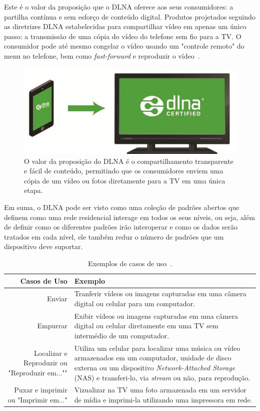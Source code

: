 Este é o valor da proposição que o DLNA oferece aos seus consumidores: a partilha contínua e sem esforço de conteúdo digital. Produtos projetados seguindo as diretrizes DLNA estabelecidas para compartilhar vídeo em apenas um único passo: a transmissão de uma cópia do vídeo do telefone sem fio para a TV. O consumidor pode até mesmo congelar o vídeo usando um "controle remoto" do menu no telefone, bem como \emph{fast-forward} e reproduzir o vídeo~\cite{dlnahdvideostreaming}.

\begin{figure}[ht]
	\center
	\includegraphics[scale=0.3]{imagens/dlna2}
	\caption{O valor da proposição do DLNA é o compartilhamento transparente e fácil de conteúdo, permitindo que os consumidores enviem uma cópia de um vídeo ou fotos diretamente para a TV em uma única etapa.}
	\label{fig:dlnaProccess}
\end{figure}

Em suma, o DLNA pode ser visto como uma coleção de padrões abertos que definem como uma rede residencial interage em todos os seus níveis, ou seja, além de definir como os diferentes padrões irão interoperar e como os dados serão tratados em cada nível, ele também reduz o número de padrões que um dispositivo deve suportar.

\begin{table}
	\begin{center}
		\begin{tabular}{rl}
		\hline
		\textbf{Casos de Uso} & \textbf{Exemplo}																\\
		\hline
		Enviar & Tranferir vídeos ou imagens capturadas em uma câmera digital ou celular para um computador.	\\
		\hline
		Empurrar & Exibir vídeos ou imagens capturadas em uma câmera digital ou celular diretamente em uma TV sem intermédio de um computador. \\
		\hline
		Localizar e Reproduzir ou "Reproduzir em..."" & Utiliza um celular para localizar uma música ou vídeo armazenados em um computador, unidade de disco externa ou um dispositivo \emph{Network-Attached Storage} (NAS) e transferi-lo, via \emph{stream} ou não, para reprodução. \\
		\hline
		Puxar e imprimir ou "Imprimir em..." & Vizualizar na TV uma foto armazenada em um servidor de mídia e imprimi-la utilizando uma impressora em rede. \\
		\hline
		\end{tabular}
	\end{center}
	\caption{Exemplos de casos de uso~\cite{dlnahdvideostreaming}.}
	\label{tab:casosdeuso_dlna}
\end{table}

